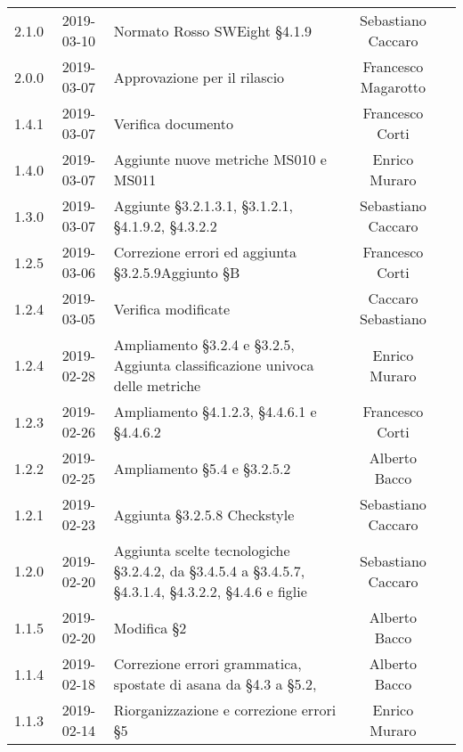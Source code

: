 {\begin{longtable}{ c c C{4cm} c c }
		2.1.0 & 2019-03-10 & Normato Rosso SWEight §4.1.9 & Sebastiano Caccaro & \reda{} \\			
		
		2.0.0 & 2019-03-07 & Approvazione per il rilascio & Francesco Magarotto & \Res{} \\		
		
		1.4.1 & 2019-03-07 & Verifica documento & Francesco Corti & \ver{} \\	
		
		1.4.0 & 2019-03-07 & Aggiunte nuove metriche MS010 e MS011 & Enrico Muraro & \reda{} \\
		
		1.3.0 & 2019-03-07 & Aggiunte §3.2.1.3.1, §3.1.2.1, §4.1.9.2, §4.3.2.2 & Sebastiano Caccaro & \reda{} \\
		
		1.2.5 & 2019-03-06 & Correzione errori ed aggiunta §3.2.5.9\newline Aggiunto §B & Francesco Corti & \reda{} \\
		
		1.2.4 & 2019-03-05 & Verifica modificate & Caccaro Sebastiano & \ver{} \\		
		
		1.2.4 & 2019-02-28 & Ampliamento §3.2.4 e §3.2.5, Aggiunta classificazione univoca delle metriche & Enrico Muraro & \reda{} \\
		
		1.2.3 & 2019-02-26 & Ampliamento §4.1.2.3, §4.4.6.1 e §4.4.6.2 & Francesco Corti & \reda{} \\	
		
		1.2.2 & 2019-02-25 & Ampliamento §5.4 e §3.2.5.2 & Alberto Bacco & \reda{} \\
		
		1.2.1 & 2019-02-23 & Aggiunta §3.2.5.8 Checkstyle & Sebastiano Caccaro & \reda{} \\		
		
		1.2.0 & 2019-02-20 & Aggiunta scelte tecnologiche §3.2.4.2, da §3.4.5.4 a §3.4.5.7, §4.3.1.4, §4.3.2.2, §4.4.6 e figlie & Sebastiano Caccaro & \reda{} \\	
		
		1.1.5 & 2019-02-20 & Modifica §2 & Alberto Bacco & \reda{} \\
		
		1.1.4 & 2019-02-18 & Correzione errori grammatica, spostate di asana da §4.3 a §5.2, & Alberto Bacco & \reda{} \\
		
		1.1.3 & 2019-02-14 & Riorganizzazione e correzione errori §5 & Enrico Muraro & \reda{} \\
		

\end{longtable}}
